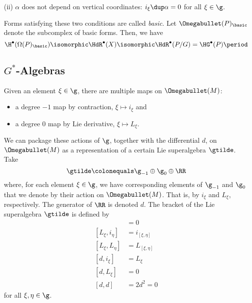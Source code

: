 (ii) $\alpha$ does not depend on vertical coordinates: $i_\xi\dup \alpha=0$ for all $\xi\in\g$. 

\noindent Forms satisfying these two conditions are called \emph{basic}. Let $\Omegabullet(P)_{\basic}$ denote the subcomplex of basic forms. Then, we have 
\[
	\H^\bullet(\Omega(P)_{\basic})\isomorphic\HdR^\bullet(X)\isomorphic\HdR^\bullet(P/G)=\HG^\bullet(P)\period
\]


\subsection{\texorpdfstring{$G^*$}{G*}-Algebras}

Given an element $\xi\in \g$, there are multiple maps on $\Omegabullet(M)$:

\begin{itemize}

\item a degree $-1$ map by contraction, $\xi\mapsto i_\xi$ and 

\item a degree $0$ map by Lie derivative, $\xi\mapsto L_\xi$.

\end{itemize}

We can package these actions of $\g $, together with the differential $d$, on $\Omegabullet(M)$ as a representation of a certain Lie superalgebra $\gtilde$. 
Take 
\[\gtilde\colonequals \g_{-1}\oplus\g_0\oplus\RR\]
where, for each element $\xi\in\g$, we have corresponding elements of $\g_{-1}$ and $\g_0$ that we denote by their action on $\Omegabullet(M)$. That is, by $i_\xi$ and $L_\xi$, respectively. 
The generator of $\RR$ is denoted $d$. 
The bracket of the Lie superalgebra $\gtilde$ is defined by
\begin{align*}
	[i_\xi,i_\eta] &= 0\\
	[L_\xi,i_\eta] &= i_{[\xi,\eta]}\\
	[L_\xi,L_\eta] &= L_{[\xi,\eta]}\\
	[d,i_\xi] &= L_\xi\\
	[d,L_\xi] &= 0\\
	[d,d] &= 2d^2 = 0
\end{align*}
for all $\xi,\eta\in\g$.

